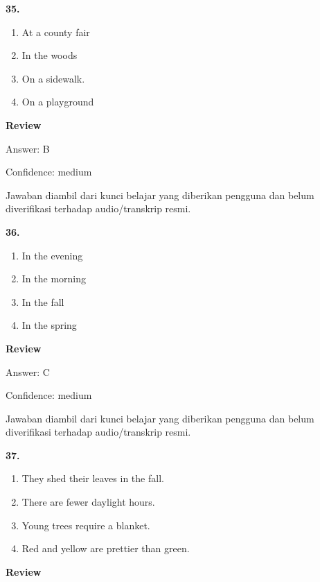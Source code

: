\documentclass[12pt]{article}
\begin{document}
\noindent\textbf{35.}
\begin{enumerate}[label=(\Alph*),leftmargin=*,itemsep=0.2em]
\item At a county fair
\item In the woods
\item On a sidewalk.
\item On a playground
\end{enumerate}
\par
\begingroup
\setlength{\parskip}{0pt}
\setlength{\parindent}{0pt}
\textbf{Review}\par
Answer: B\par
Confidence: medium\par
Jawaban diambil dari kunci belajar yang diberikan pengguna dan belum diverifikasi terhadap audio/transkrip resmi.\par
\endgroup
\par
\vspace{0.25\baselineskip}
\noindent\textbf{36.}
\begin{enumerate}[label=(\Alph*),leftmargin=*,itemsep=0.2em]
\item In the evening
\item In the morning
\item In the fall
\item In the spring
\end{enumerate}
\par
\begingroup
\setlength{\parskip}{0pt}
\setlength{\parindent}{0pt}
\textbf{Review}\par
Answer: C\par
Confidence: medium\par
Jawaban diambil dari kunci belajar yang diberikan pengguna dan belum diverifikasi terhadap audio/transkrip resmi.\par
\endgroup
\par
\vspace{0.25\baselineskip}
\noindent\textbf{37.}
\begin{enumerate}[label=(\Alph*),leftmargin=*,itemsep=0.2em]
\item They shed their leaves in the fall.
\item There are fewer daylight hours.
\item Young trees require a blanket.
\item Red and yellow are prettier than green.
\end{enumerate}
\par
\begingroup
\setlength{\parskip}{0pt}
\setlength{\parindent}{0pt}
\textbf{Review}\par
\end{document}
